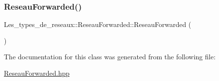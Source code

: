 \subsubsection{\texorpdfstring{Reseau\+Forwarded()}{ReseauForwarded()}}
{\footnotesize\ttfamily Les\+\_\+types\+\_\+de\+\_\+reseaux\+::\+Reseau\+Forwarded\+::\+Reseau\+Forwarded (\begin{DoxyParamCaption}{ }\end{DoxyParamCaption})}



The documentation for this class was generated from the following file\+:\begin{DoxyCompactItemize}
\item 
\hyperlink{_reseau_forwarded_8hpp}{Reseau\+Forwarded.\+hpp}\end{DoxyCompactItemize}

